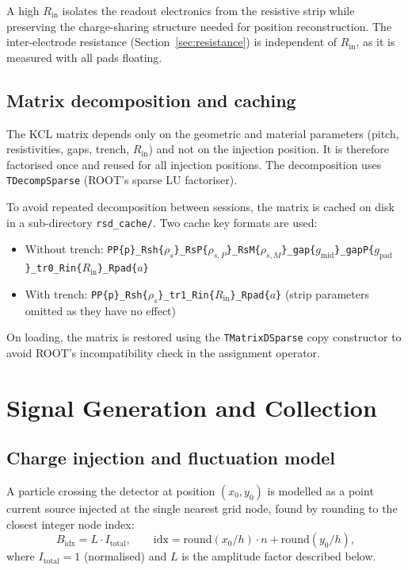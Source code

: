 \documentclass[preprint,numbers,1p]{elsarticle}
\begin{document}
A high $R_\mathrm{in}$ isolates the readout electronics from the resistive strip while
preserving the charge-sharing structure needed for position reconstruction. The
inter-electrode resistance (Section~\ref{sec:resistance}) is independent of $R_\mathrm{in}$,
as it is measured with all pads floating.

\subsection{Matrix decomposition and caching}
\label{sec:cache}

The KCL matrix depends only on the geometric and material parameters (pitch, resistivities,
gaps, trench, $R_\mathrm{in}$) and not on the injection position. It is therefore factorised
once and reused for all injection positions. The decomposition uses \texttt{TDecompSparse}
(ROOT's sparse LU factoriser).

To avoid repeated decomposition between sessions, the matrix is cached on disk in a
sub-directory \texttt{rsd\_cache/}. Two cache key formats are used:
\begin{itemize}
  \item Without trench: \texttt{PP\{p\}\_Rsh\{$\rho_s$\}\_RsP\{$\rho_{s,P}$\}\_RsM\{$\rho_{s,M}$\}\_gap\{$g_\mathrm{mid}$\}\_gapP\{$g_\mathrm{pad}$\}\_tr0\_Rin\{$R_\mathrm{in}$\}\_Rpad\{$a$\}}
  \item With trench: \texttt{PP\{p\}\_Rsh\{$\rho_s$\}\_tr1\_Rin\{$R_\mathrm{in}$\}\_Rpad\{$a$\}} (strip parameters omitted as they have no effect)
\end{itemize}
On loading, the matrix is restored using the \texttt{TMatrixDSparse} copy constructor to
avoid ROOT's incompatibility check in the assignment operator.

\section{Signal Generation and Collection}
\label{sec:signal}

\subsection{Charge injection and fluctuation model}
\label{sec:injection}

A particle crossing the detector at position $(x_0, y_0)$ is modelled as a point current source
injected at the single nearest grid node, found by rounding to the closest integer node index:
\begin{equation}
  B_\mathrm{idx} = L \cdot I_\mathrm{total}, \qquad
  \mathrm{idx} = \mathrm{round}(x_0/h)\cdot n + \mathrm{round}(y_0/h),
\end{equation}
where $I_\mathrm{total} = 1$ (normalised) and $L$ is the amplitude factor described below.
\end{document}
